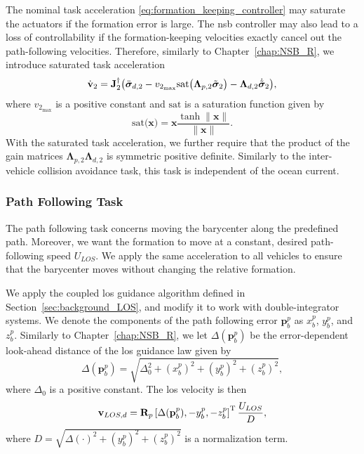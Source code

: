 The nominal task acceleration \eqref{eq:formation_keeping_controller} may saturate the actuators if the formation error is large. The \gls{nsb} controller may also lead to a loss of controllability if the formation-keeping velocities exactly cancel out the path-following velocities. Therefore, similarly to Chapter~\ref{chap:NSB_R}, we introduce saturated task acceleration
\begin{equation}\label{eq:saturated_formation_keeping}
\dot{\mathbf{v}}_2 = \mathbf{J}_2^\dagger \bigl(\ddot{\bm{\sigma}}_{d,2} - v_{2_{\max}}\mathrm{sat}\bigl(\mathbf{\Lambda}_{p,2}\Tilde{\bm{\sigma}}_2\bigr) - \mathbf{\Lambda}_{d,2} \dot{\Tilde{\bm{\sigma}}}_2\bigr),
\end{equation}
where $v_{2_{\max}}$ is a positive constant and $\mathrm{sat}$ is a saturation function given by
\begin{equation}
    \mathrm{sat}\bigl(\mathbf{x}\bigr) = \mathbf{x}\frac{\tanh{\|\mathbf{x}\|}}{\|\mathbf{x}\|}.
\end{equation}
With the saturated task acceleration, we further require that the product of the gain matrices $\mathbf{\Lambda}_{p,2} \mathbf{\Lambda}_{d,2}$ is symmetric positive definite.
Similarly to the inter-vehicle collision avoidance task, this task is independent of the ocean current.%

\subsubsection{Path Following Task}
The path following task concerns moving the barycenter along the predefined path. Moreover, we want the formation to move at a constant, desired path-following speed $U_{LOS}$. We apply the same acceleration to all vehicles to ensure that the barycenter moves without changing the relative formation.

We apply the coupled \acrfull{los} guidance algorithm defined in Section~\ref{sec:background_LOS}, and modify it to work with double-integrator systems. We denote the components of the path following error $\mathbf{p}_b^p$ as $x_b^p$, $y_b^p$, and $z_b^p$. Similarly to Chapter~\ref{chap:NSB_R}, we let $\Delta(\mathbf{p}_b^p)$ be the error-dependent look-ahead distance of the \gls{los} guidance law given by
\begin{equation}
    \Delta(\mathbf{p}_b^p) = \sqrt{\Delta_0^2 + (x_b^p)^2 + (y_b^p)^2 + (z_b^p)^2},
\end{equation}
where $\Delta_0$ is a positive constant. The \gls{los} velocity is then
\begin{equation}\label{eq:desired_LOS}
    \mathbf{v}_{LOS, d} = \mathbf{R}_p \left[ \Delta(\mathbf{p}_b^p), -y_b^p, -z_b^p \right]^{\mathrm{T}} \frac{U_{LOS}}{D},
\end{equation}
where 
$
    D = \sqrt{\Delta(\cdot)^2 + (y_b^p)^2 + (z_b^p)^2}
$
is a normalization term.

